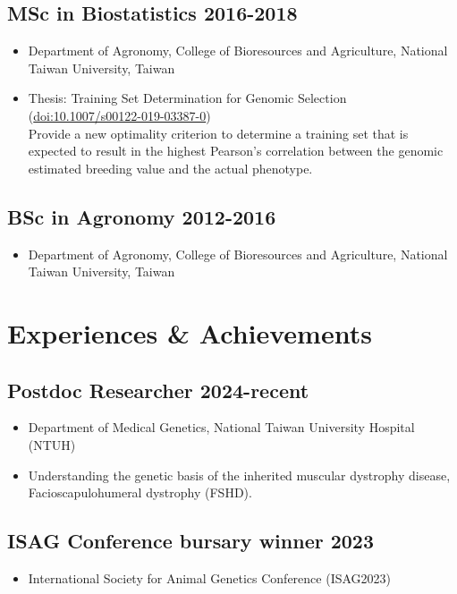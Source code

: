 \documentclass[10pt]{article}
\begin{document}
\subsection*{MSc in Biostatistics \hfill 2016-2018}
\begin{itemize}
\item Department of Agronomy, College of Bioresources and Agriculture, National Taiwan University, Taiwan
\item Thesis: Training Set Determination for Genomic Selection (\href{https://doi.org/10.1007/s00122-019-03387-0}{doi:10.1007/s00122-019-03387-0}) \\ {\color{gray} Provide a new optimality criterion to determine a training set that is expected to result in the highest Pearson's correlation between the genomic estimated breeding value and the actual phenotype.}
\end{itemize}


\subsection*{BSc in Agronomy \hfill 2012-2016}
\begin{itemize}
\item Department of Agronomy, College of Bioresources and Agriculture, National Taiwan University, Taiwan
\end{itemize}



\section*{Experiences \& Achievements}

\subsection*{Postdoc Researcher \hfill 2024-recent}
\begin{itemize}
\item Department of Medical Genetics, National Taiwan University Hospital (NTUH)
\item Understanding the genetic basis of the inherited muscular dystrophy disease, Facioscapulohumeral dystrophy (FSHD).
\end{itemize}

\subsection*{ISAG Conference bursary winner \hfill 2023}
\begin{itemize}
\item International Society for Animal Genetics Conference (ISAG2023)
\end{itemize}
\end{document}
